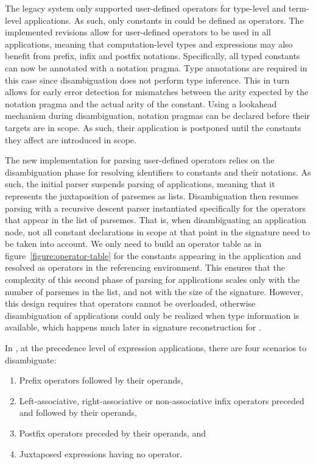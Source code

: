 The legacy \Beluga system only supported user-defined operators for \LF type-level and term-level applications.
As such, only constants in \LF could be defined as operators.
The implemented revisions allow for user-defined operators to be used in all applications, meaning that computation-level types and expressions may also benefit from prefix, infix and postfix notations.
Specifically, all typed constants can now be annotated with a notation pragma.
Type annotations are required in this case since disambiguation does not perform type inference.
This in turn allows for early error detection for mismatches between the arity expected by the notation pragma and the actual arity of the constant.
Using a lookahead mechanism during disambiguation, notation pragmas can be declared before their targets are in scope.
As such, their application is postponed until the constants they affect are introduced in scope.

The new implementation for parsing user-defined operators relies on the disambiguation phase for resolving identifiers to constants and their notations.
As such, the initial parser suspends parsing of applications, meaning that it represents the juxtaposition of parsemes as lists.
Disambiguation then resumes parsing with a recursive descent parser instantiated specifically for the operators that appear in the list of parsemes.
That is, when disambiguating an application node, not all constant declarations in scope at that point in the \Beluga signature need to be taken into account.
We only need to build an operator table as in figure~\ref{figure:operator-table} for the constants appearing in the application and resolved as operators in the referencing environment.
This ensures that the complexity of this second phase of parsing for applications scales only with the number of parsemes in the list, and not with the size of the signature.
However, this design requires that operators cannot be overloaded, otherwise disambiguation of applications could only be realized when type information is available, which happens much later in signature reconstruction for \Beluga.

In \Beluga, at the precedence level of expression applications, there are four scenarios to disambiguate:
\begin{enumerate}
\item Prefix operators followed by their operands,
\item Left-associative, right-associative or non-associative infix operators preceded and followed by their operands,
\item Postfix operators preceded by their operands, and
\item Juxtaposed expressions having no operator.
\end{enumerate}

